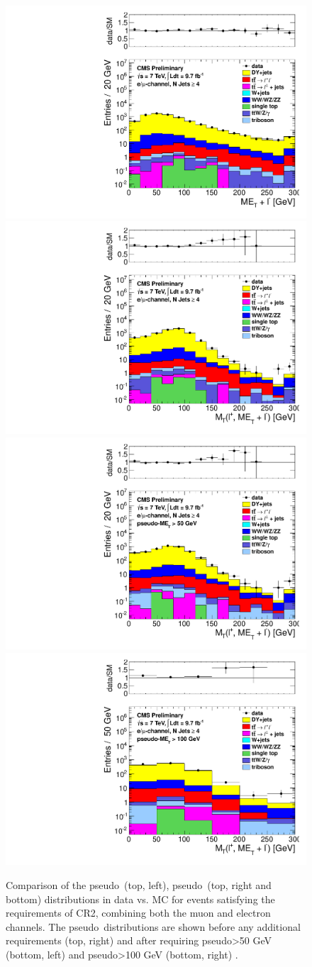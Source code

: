 \begin{figure}[hbt]
  \begin{center}
	\includegraphics[width=0.5\linewidth]{plots/CR2plots/met_lepcor_scaled_nj4_emucomb.pdf}%
	\includegraphics[width=0.5\linewidth]{plots/CR2plots/mt_lepcor_scaled_nj4_emucomb.pdf}
	\includegraphics[width=0.5\linewidth]{plots/CR2plots/mt_lepcor_scaled_met50_nj4_emucomb.pdf}%
	\includegraphics[width=0.5\linewidth]{plots/CR2plots/mt_lepcor_scaled_met100_nj4_emucomb.pdf}

    \caption{
      Comparison of the pseudo\-\met\ (top, left), pseudo\-\mt\ (top,
      right and bottom) distributions in data vs. MC for events
      satisfying the requirements of CR2, combining both the muon and
      electron channels. The pseudo\-\mt\ distributions are shown
      before any additional requirements (top, right) and after
      requiring pseudo\-\met>50 GeV (bottom, left) and pseudo\-\met>100 GeV (bottom, right) .
\label{fig:cr2met} 
}  
      \end{center}
\end{figure}

